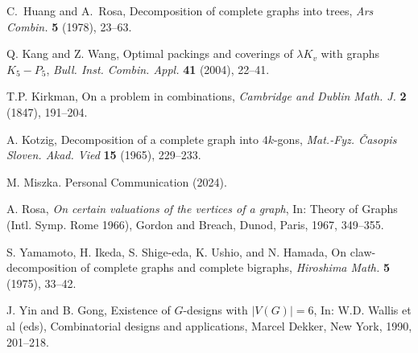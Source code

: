 \documentclass{article}
\theoremstyle{plain}
\theoremstyle{definition}
\theoremstyle{plain}
\theoremstyle{plain}
\theoremstyle{plain}
\begin{document}
\begin{thebibliography}{10}
 C.~Huang and A.~Rosa, 
 {Decomposition of complete graphs into trees},
 \emph{Ars Combin.} \textbf{5} (1978), 23--63.
 
 Q. Kang and Z. Wang, 
 Optimal packings and coverings of $\lambda K_{v}$ with graphs $K_{5}-P_{5}$, 
 {\em Bull. Inst. Combin. Appl.}
 \textbf{41} (2004),  22--41.
 
 T.P. Kirkman,
 On a problem in combinations,
 \emph{Cambridge and Dublin Math. J.}
 \textbf{2} (1847), 191--204.
 
 A. Kotzig, 
 Decomposition of a complete graph into $4k$-gons, 
 \emph{Mat.-Fyz. \v Casopis Sloven. Akad. Vied} 
 \textbf{15} (1965), 229--233.
 
 M. Miszka. Personal Communication (2024).
 
 A. Rosa, 
 {\em On certain valuations of the vertices of a graph}, 
 {In: Theory of Graphs (Intl. Symp. Rome 1966)}, Gordon and Breach, Dunod, Paris, 1967, 349--355.
 
 S. Yamamoto, H. Ikeda, S. Shige-eda, K. Ushio, and N. Hamada,
 On claw-decomposition of complete graphs and complete bigraphs,
 \emph{Hiroshima Math.}
 \textbf{5} (1975), 33--42.
 
  J. Yin and B. Gong, Existence of $G$-designs with $|V(G)|=6$, In: W.D. Wallis et al (eds), Combinatorial designs and applications, Marcel Dekker, New York, 1990, 201--218.
 
 \end{thebibliography}
\end{document}
